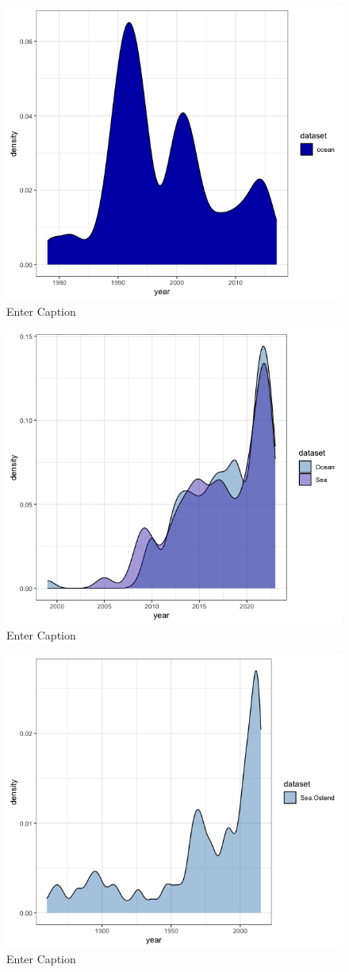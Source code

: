 \documentclass[a4paper, twoside, 12pt]{book}
\begin{document}
\begin{figure}
    \centering
    \includegraphics[width=0.5\linewidth]{ocean density 0,5.png}
    \caption{Enter Caption}
    \label{fig:enter-label}
\end{figure}

\begin{figure}
    \centering
    \includegraphics[width=0.5\linewidth]{ocean sea adjust 0,5.png}
    \caption{Enter Caption}
    \label{fig:enter-label}
\end{figure}

\begin{figure}
    \centering
    \includegraphics[width=0.5\linewidth]{ostend adjust 0.3.png}
    \caption{Enter Caption}
    \label{fig:enter-label}
\end{figure}
\end{document}
